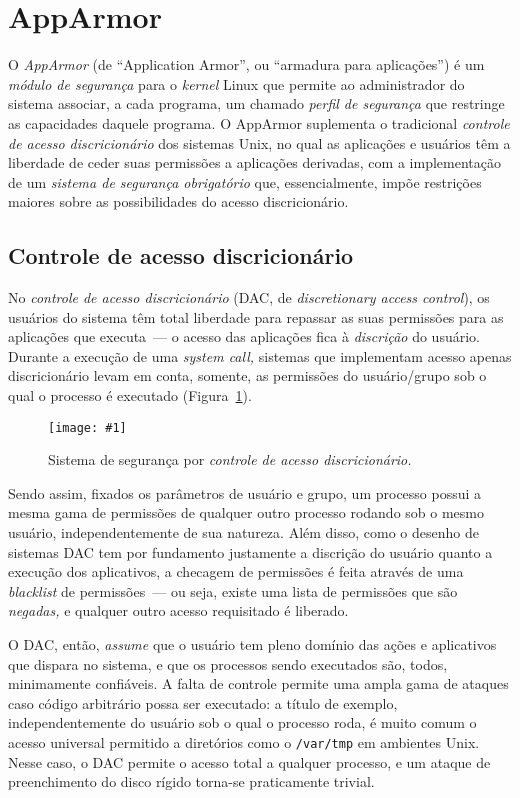 \documentclass[ruledheader, 12pt]{abnt}
\newcommand{\figcustom}[4]{\par
	\begin{figure}[#3]
		\centering
		\texttt{[image: \#1]}
		\caption{\label{fig:#1}#2}
	\end{figure}
\par}
\newcommand{\figref}[1]{(Figura~\ref{fig:#1})}
\begin{document}
\clearpage
\section{AppArmor}

O \emph{AppArmor} (de ``Application Armor'', ou ``armadura para aplicações'') é um \emph{módulo de segurança} para o \emph{kernel} Linux que permite ao administrador do sistema associar, a cada programa, um chamado \emph{perfil de segurança} que restringe as capacidades daquele programa. O AppArmor suplementa o tradicional \emph{controle de acesso discricionário} dos sistemas Unix, no qual as aplicações e usuários têm a liberdade de ceder suas permissões a aplicações derivadas, com a implementação de um \emph{sistema de segurança obrigatório} que, essencialmente, impõe restrições maiores sobre as possibilidades do acesso discricionário.


\subsection{Controle de acesso discricionário}

No \emph{controle de acesso discricionário} (DAC, de \emph{discretionary access control}), os usuários do sistema têm total liberdade para repassar as suas permissões para as aplicações que executa~--- o acesso das aplicações fica à \emph{discrição} do usuário. Durante a execução de uma \emph{system call,} sistemas que implementam acesso apenas discricionário levam em conta, somente, as permissões do usuário/grupo sob o qual o processo é executado \figref{syscalls-dac}. 

\figcustom{syscalls-dac}{Sistema de segurança por \emph{controle de acesso discricionário.}}{tp}{.8}

Sendo assim, fixados os parâmetros de usuário e grupo, um processo possui a mesma gama de permissões de qualquer outro processo rodando sob o mesmo usuário, independentemente de sua natureza. Além disso, como o desenho de sistemas DAC tem por fundamento justamente a discrição do usuário quanto a execução dos aplicativos, a checagem de permissões é feita através de uma \emph{blacklist} de permissões~--- ou seja, existe uma lista de permissões que são \emph{negadas,} e qualquer outro acesso requisitado é liberado.

O DAC, então, \emph{assume} que o usuário tem pleno domínio das ações e aplicativos que dispara no sistema, e que os processos sendo executados são, todos, minimamente confiáveis. A falta de controle permite uma ampla gama de ataques caso código arbitrário possa ser executado: a título de exemplo, independentemente do usuário sob o qual o processo roda, é muito comum o acesso universal permitido a diretórios como o \verb|/var/tmp| em ambientes Unix. Nesse caso, o DAC permite o acesso total a qualquer processo, e um ataque de preenchimento do disco rígido torna-se praticamente trivial.
\end{document}
